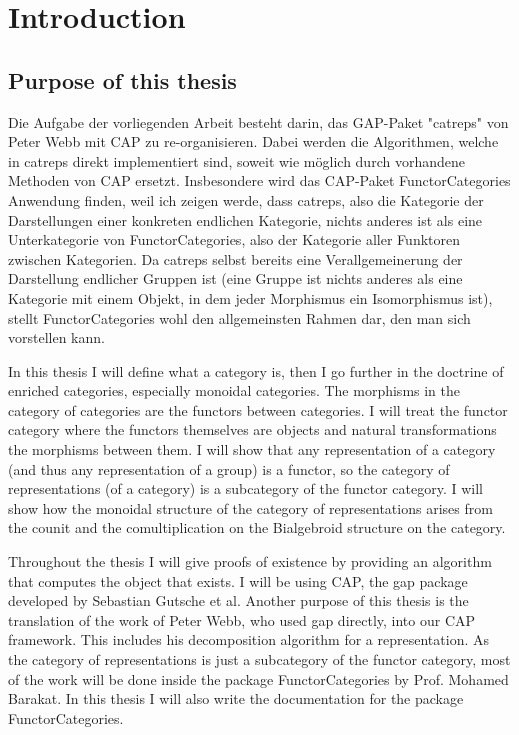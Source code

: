 
\section{Introduction}

\subsection{Purpose of this thesis}

Die Aufgabe der vorliegenden Arbeit besteht darin, das GAP-Paket "catreps" von Peter Webb mit CAP zu re-organisieren. Dabei werden die Algorithmen, welche in catreps direkt implementiert sind, soweit wie möglich durch vorhandene Methoden von CAP ersetzt.
Insbesondere wird das CAP-Paket FunctorCategories Anwendung finden, weil ich zeigen werde, dass catreps, also die Kategorie der Darstellungen einer konkreten endlichen Kategorie, nichts anderes ist als eine Unterkategorie von FunctorCategories, also der Kategorie aller Funktoren zwischen Kategorien. 
Da catreps selbst bereits eine Verallgemeinerung der Darstellung endlicher Gruppen ist (eine Gruppe ist nichts anderes als eine Kategorie mit einem Objekt, in dem jeder Morphismus ein Isomorphismus ist), stellt FunctorCategories wohl den allgemeinsten Rahmen dar, den man sich vorstellen kann.

In this thesis I will define what a category is, then I go further in the doctrine of enriched categories, especially monoidal categories.
The morphisms in the category of categories are the functors between categories. I will treat the functor category where the functors themselves are
objects and natural transformations the morphisms between them. I will show that any representation of a category (and thus any representation
of a group) is a functor, so the category of representations (of a category) is a subcategory of the functor category.
I will show how the monoidal structure of the category of representations arises from the counit and the comultiplication on the Bialgebroid structure
on the category.

\noindent Throughout the thesis I will give proofs of existence by providing an algorithm that computes the object that exists. I will be using CAP, the gap package
developed by Sebastian Gutsche et al. Another purpose of this thesis is the translation of the work of Peter Webb, who used gap directly, into our CAP
framework. This includes his decomposition algorithm for a representation. As the category of representations is just a subcategory of the functor category,
most of the work will be done inside the package FunctorCategories by Prof. Mohamed Barakat. In this thesis I will also write the documentation for the
package FunctorCategories.
